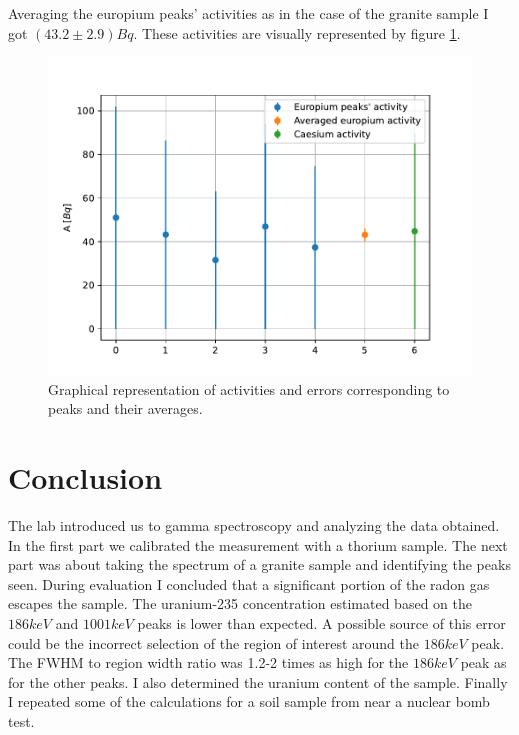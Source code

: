 \documentclass[pdftex,12pt,a4paper]{article}
\begin{document}
		Averaging the europium peaks' activities as in the case of the granite sample I got $(43.2\pm 2.9)Bq$. These activities are visually represented by figure \ref{soilaveragesfig}.
			\begin{figure}[H]
			\centering
			\includegraphics[scale=1]{./figs/soilactivities.pdf}
			\caption{Graphical representation of activities and errors corresponding to peaks and their averages.}
			\label{soilaveragesfig}
		\end{figure}
	\section{Conclusion}
		The lab introduced us to gamma spectroscopy and analyzing the data obtained. In the first part we calibrated the measurement with a thorium sample. The next part was about taking the spectrum of a granite sample and identifying the peaks seen. During evaluation I concluded that a significant portion of the radon gas escapes the sample. The uranium-235 concentration estimated based on the $186keV$ and $1001keV$ peaks is lower than expected. A possible source of this error could be the incorrect selection of the region of interest around the $186keV$ peak. The FWHM to region width ratio was 1.2-2 times as high for the $186keV$ peak as for the other peaks. I also determined the uranium content of the sample. Finally I repeated some of the calculations for a soil sample from near a nuclear bomb test.
	
\end{document}
